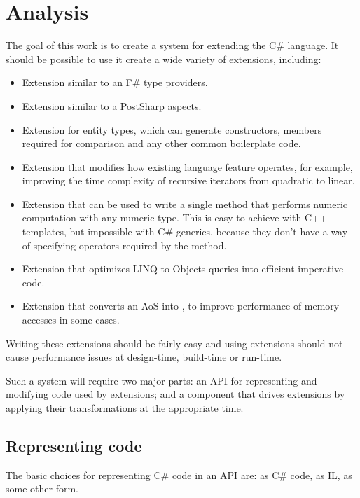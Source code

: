 \chapter{Analysis}

The goal of this work is to create a system for extending the C\# language. It should be possible to use it create a wide variety of extensions, including:

\begin{itemize}
\item Extension similar to an F\# type providers.
\item Extension similar to a PostSharp aspects.
\item Extension for entity types, which can generate constructors, members required for comparison and any other common boilerplate code.
\item Extension that modifies how existing language feature operates, for example, improving the time complexity of recursive iterators from quadratic to linear.
\item Extension that can be used to write a single method that performs numeric computation with any numeric type. This is easy to achieve with C++ templates, but impossible with C\# generics, because they don't have a way of specifying operators required by the method.
\item Extension that optimizes LINQ to Objects queries into efficient imperative code.
\item Extension that converts an \ac{AoS} into , to improve performance of memory accesses in some cases.
\end{itemize}


Writing these extensions should be fairly easy and using extensions should not cause performance issues at design-time, build-time or run-time.

\medskip

Such a system will require two major parts: an \ac{API} for representing and modifying code used by extensions; and a component that drives extensions by applying their transformations at the appropriate time.

\section{Representing code}
\label{representing-code}

The basic choices for representing C\# code in an \ac{API} are: as C\# code, as \ac{IL}, as some other form.

